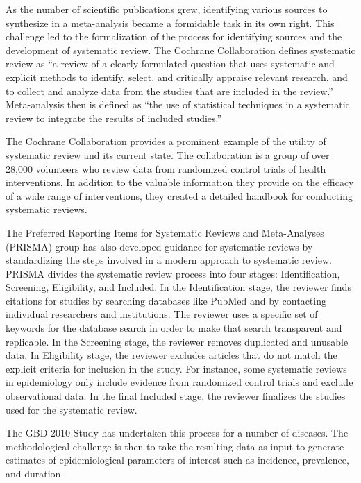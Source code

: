 As the number of scientific publications grew, identifying various
sources to synthesize in a meta-analysis became a formidable task in
its own right. This challenge led to the formalization of the process
for identifying sources and the development of systematic review. The
Cochrane Collaboration defines systematic review as ``a review of a
clearly formulated question that uses systematic and explicit methods
to identify, select, and critically appraise relevant research, and to
collect and analyze data from the studies that are included in the
review.'' Meta-analysis then is defined as ``the use of statistical
techniques in a systematic review to integrate the results of included
studies.''\cite{Green_Systematic_2005}

The Cochrane Collaboration provides a prominent example of the utility
of systematic review and its current state. The collaboration is a
group of over 28,000 volunteers who review data from randomized
control trials of health interventions.\cite{Cochrane_Cochrane_2012} In addition to the valuable information
they provide on the efficacy of a wide range of interventions, they
created a detailed handbook for conducting systematic
reviews.

The Preferred Reporting Items for Systematic Reviews and Meta-Analyses
(PRISMA) group has also developed guidance for systematic reviews by
standardizing the steps involved in a modern approach to systematic
review.\cite{Liberati_PRISMA_2009} PRISMA divides the systematic
review process into four stages: Identification, Screening,
Eligibility, and Included.  In the Identification stage, the reviewer
finds citations for studies by searching databases like PubMed and by
contacting individual researchers and institutions. The reviewer uses
a specific set of keywords for the database search in order to make
that search transparent and replicable. In the Screening stage, the
reviewer removes duplicated and unusable data. In Eligibility stage,
the reviewer excludes articles that do not match the explicit criteria
for inclusion in the study. For instance, some systematic reviews in
epidemiology only include evidence from randomized control trials and
exclude observational data. In the final Included stage, the reviewer
finalizes the studies used for the systematic review.

The GBD 2010 Study has undertaken this process for a
number of diseases. The methodological challenge is then to take the
resulting data as input to generate estimates of epidemiological
parameters of interest such as incidence, prevalence, and duration.

